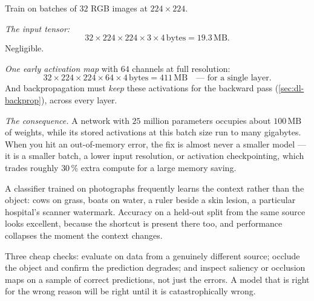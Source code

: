 \begin{workedexample}
Train on batches of $32$ RGB images at $224\times224$.

\emph{The input tensor:}
\[
  32 \times 224 \times 224 \times 3 \times 4\,\text{bytes}
  = 19.3\,\text{MB}.
\]
Negligible.

\emph{One early activation map} with $64$ channels at full resolution:
\[
  32 \times 224\times224 \times 64 \times 4\,\text{bytes}
  = 411\,\text{MB} \quad\text{--- for a single layer.}
\]
And backpropagation must \emph{keep} these activations for the backward pass
(\cref{sec:dl-backprop}), across every layer.

\emph{The consequence.} A network with $25$ million parameters occupies about
$100\,\text{MB}$ of weights, while its stored activations at this batch size
run to many gigabytes. When you hit an out-of-memory error, the fix is almost
never a smaller model --- it is a smaller batch, a lower input resolution, or
activation checkpointing, which trades roughly $30\,\%$ extra compute for a
large memory saving.
\end{workedexample}

\begin{cautionbox}
A classifier trained on photographs frequently learns the context rather than
the object: cows on grass, boats on water, a ruler beside a skin lesion, a
particular hospital's scanner watermark. Accuracy on a held-out split from the
same source looks excellent, because the shortcut is present there too, and
performance collapses the moment the context changes.

Three cheap checks: evaluate on data from a genuinely different source; occlude
the object and confirm the prediction degrades; and inspect saliency or occlusion
maps on a sample of correct predictions, not just the errors. A model that is
right for the wrong reason will be right until it is catastrophically wrong.
\end{cautionbox}

